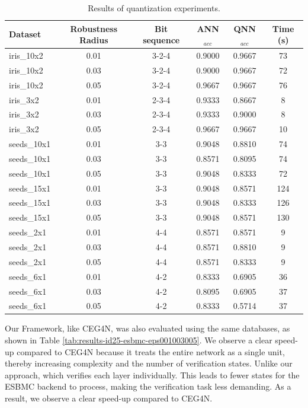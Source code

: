 \begin{table}[!hb]
\centering
\caption{Results of quantization experiments.}
\label{tab:ceg4n_results}
\begin{tabular}{l c c c c c}
\hline
Dataset & Robustness Radius & Bit sequence &  ANN$_{acc}$ & QNN$_{acc}$ & Time (s)\\
\hline
iris\_10x2 &  0.01 &3-2-4 & 0.9000 & 0.9667 & 73 \\
iris\_10x2 &  0.03 &3-2-4 & 0.9000 & 0.9667 & 72 \\
iris\_10x2 &  0.05 &3-2-4 & 0.9667 & 0.9667 & 76 \\
\midrule
iris\_3x2 &  0.01 &2-3-4 & 0.9333 & 0.8667 & 8 \\
iris\_3x2 &  0.03 &2-3-4 & 0.9333 & 0.9000 & 8 \\
iris\_3x2 &  0.05 &2-3-4 & 0.9667 & 0.9667 & 10 \\
\midrule
seeds\_10x1 &  0.01 &3-3 & 0.9048 & 0.8810 & 74 \\
seeds\_10x1 &  0.03 &3-3 & 0.8571 & 0.8095 & 74 \\
seeds\_10x1 &  0.05 &3-3 & 0.9048 & 0.8333 & 72 \\
\midrule
seeds\_15x1 &  0.01 &3-3 & 0.9048 & 0.8571 & 124 \\
seeds\_15x1 &  0.03 &3-3 & 0.9048 & 0.8333 & 126 \\
seeds\_15x1 &  0.05 &3-3 & 0.9048 & 0.8571 & 130 \\
\midrule
seeds\_2x1 &  0.01 &4-4 & 0.8571 & 0.8571 & 9 \\
seeds\_2x1 &  0.03 &4-4 & 0.8571 & 0.8810 & 9 \\
seeds\_2x1 &  0.05 &4-4 & 0.8571 & 0.8333 & 9 \\
\midrule
seeds\_6x1 &  0.01 &4-2 & 0.8333 & 0.6905 & 36 \\
seeds\_6x1 &  0.03 &4-2 & 0.8095 & 0.6905 & 37 \\
seeds\_6x1 &  0.05 &4-2 & 0.8333 & 0.5714 & 37 \\
\hline
\end{tabular}
\end{table}

Our Framework, like CEG4N, was also evaluated using the same databases, as shown in Table \ref{tab:results-id25-esbmc-eps001003005}. We observe a clear speed-up compared to CEG4N because it treats the entire network as a single unit, thereby increasing complexity and the number of verification states.  Unlike our approach, which verifies each layer individually. This leads to fewer states for the ESBMC backend to process, making the verification task less demanding. As a result, we observe a clear speed-up compared to CEG4N. 

